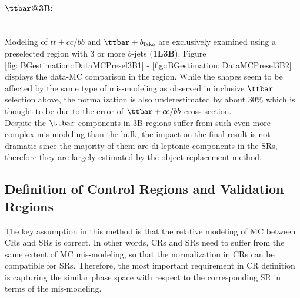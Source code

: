\paragraph{\underline{$\ttbar$@3B:}} \mbox{} \\
Modeling of $tt+cc/bb$ and $\ttbarFakeB$ are exclusively examined using a preselected region with 3 or more $b$-jets (\textbf{1L3B}). Figure \ref{fig::BGestimation::DataMCPresel3B1} - \ref{fig::BGestimation::DataMCPresel3B2} displays the data-MC comparison in the region. While the shapes seem to be affected by the same type of mis-modeling as observed in inclusive $\ttbar$ selection above, the normalization is also underestimated by about $30\%$ which is thought to be due to the error of $\ttbar+cc/bb$ cross-section. \\

Despite the $\ttbar$ components in 3B regions suffer from such even more complex mis-modeling than the bulk, the impact on the final result is not dramatic since the majority of them are di-leptonic components in the SRs, therefore they are largely estimated by the object replacement method.


%
\clearpage


%
%


\subsection{Definition of Control Regions and Validation Regions} \label{sec::BGestimation::CRdef}
The key assumption in this method is that the relative modeling of MC between CRs and SRs is correct. 
In other words, CRs and SRs need to suffer from the same extent of MC mis-modeling, 
so that the normalization in CRs can be compatible for SRs. 
Therefore, the most important requirement in CR definition is capturing the similar phase space with respect to the corresponding SR in terms of the mis-modeling. \\

